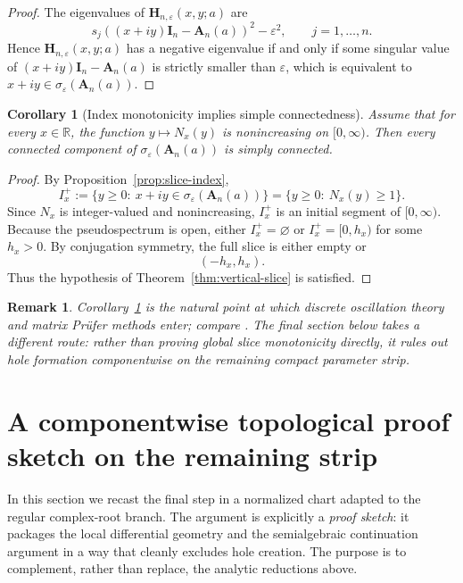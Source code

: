 \documentclass[11pt]{article}
\newtheorem{corollary}[theorem]{Corollary}
\newtheorem{remark}[theorem]{Remark}
\newcommand{\R}{\mathbb{R}}
\begin{document}
\begin{proof}
The eigenvalues of \(\mathbf H_{n,\varepsilon}(x,y;a)\) are
\[
s_j((x+iy)\mathbf I_n-\mathbf A_n(a))^2-\varepsilon^2,
\qquad j=1,\dots,n.
\]
Hence \(\mathbf H_{n,\varepsilon}(x,y;a)\) has a negative eigenvalue if and only if some singular value of \((x+iy)\mathbf I_n-\mathbf A_n(a)\) is strictly smaller than \(\varepsilon\), which is equivalent to \(x+iy\in \sigma_\varepsilon(\mathbf A_n(a))\).
\end{proof}

\begin{corollary}[Index monotonicity implies simple connectedness]\label{cor:index-monotone}
Assume that for every \(x\in\R\), the function \(y\mapsto N_x(y)\) is nonincreasing on \([0,\infty)\). Then every connected component of \(\sigma_\varepsilon(\mathbf A_n(a))\) is simply connected.
\end{corollary}

\begin{proof}
By Proposition~\ref{prop:slice-index},
\[
I_x^+:=\{y\ge 0:\ x+iy\in \sigma_\varepsilon(\mathbf A_n(a))\}
=
\{y\ge 0:\ N_x(y)\ge 1\}.
\]
Since \(N_x\) is integer-valued and nonincreasing, \(I_x^+\) is an initial segment of \([0,\infty)\). Because the pseudospectrum is open, either \(I_x^+=\varnothing\) or \(I_x^+=[0,h_x)\) for some \(h_x>0\). By conjugation symmetry, the full slice is either empty or
\[
(-h_x,h_x).
\]
Thus the hypothesis of Theorem~\ref{thm:vertical-slice} is satisfied.
\end{proof}

\begin{remark}
Corollary~\ref{cor:index-monotone} is the natural point at which discrete oscillation theory and matrix Prüfer methods enter; compare \cite{Hilscher2012,KratzHilscher2013,SchulzBaldes2007}. The final section below takes a different route: rather than proving global slice monotonicity directly, it rules out hole formation componentwise on the remaining compact parameter strip.
\end{remark}

\section{A componentwise topological proof sketch on the remaining strip}

In this section we recast the final step in a normalized chart adapted to the regular complex-root branch. The argument is explicitly a \emph{proof sketch}: it packages the local differential geometry and the semialgebraic continuation argument in a way that cleanly excludes hole creation. The purpose is to complement, rather than replace, the analytic reductions above.
\end{document}

